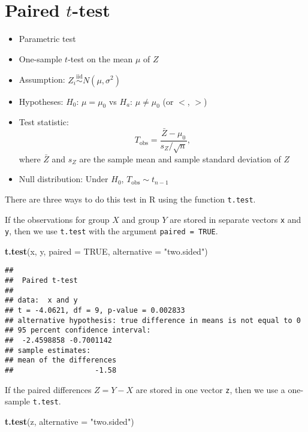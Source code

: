 \documentclass[
]{book}
\newenvironment{Shaded}{\begin{snugshade}}{\end{snugshade}}
\newcommand{\DataTypeTok}[1]{\textcolor[rgb]{0.13,0.29,0.53}{#1}}
\newcommand{\KeywordTok}[1]{\textcolor[rgb]{0.13,0.29,0.53}{\textbf{#1}}}
\newcommand{\NormalTok}[1]{#1}
\newcommand{\OtherTok}[1]{\textcolor[rgb]{0.56,0.35,0.01}{#1}}
\newcommand{\StringTok}[1]{\textcolor[rgb]{0.31,0.60,0.02}{#1}}
\providecommand{\tightlist}{%
  \setlength{\itemsep}{0pt}\setlength{\parskip}{0pt}}
\begin{document}
\hypertarget{paired-t-test}{%
\section{\texorpdfstring{Paired \(t\)-test}{Paired t-test}}\label{paired-t-test}}

\begin{itemize}
\tightlist
\item
  Parametric test
\item
  One-sample \(t\)-test on the mean \(\mu\) of \(Z\)
\item
  Assumption: \(Z_i \overset{\mathrm{iid}} \sim N(\mu, \sigma^2)\)
\item
  Hypotheses: \(H_0\): \(\mu = \mu_0\) vs \(H_a\): \(\mu \neq \mu_0\) (or \(<\), \(>\))
\item
  Test statistic: \[T_{\mathrm{obs}} = \frac{\bar{Z} - \mu_0}{s_Z / \sqrt{n}},\]
  where \(\bar{Z}\) and \(s_Z\) are the sample mean and sample standard deviation
  of \(Z\)
\item
  Null distribution: Under \(H_0\), \(T_{\mathrm{obs}} \sim t_{n-1}\)
\end{itemize}

There are three ways to do this test in R using the function \texttt{t.test}.

If the observations for group \(X\) and group \(Y\) are stored in separate vectors \texttt{x} and \texttt{y},
then we use \texttt{t.test} with the argument \texttt{paired\ =\ TRUE}.

\begin{Shaded}
\begin{Highlighting}[]
\KeywordTok{t.test}\NormalTok{(x, y, }\DataTypeTok{paired =} \OtherTok{TRUE}\NormalTok{, }\DataTypeTok{alternative =} \StringTok{"two.sided"}\NormalTok{)}
\end{Highlighting}
\end{Shaded}

\begin{verbatim}
## 
##  Paired t-test
## 
## data:  x and y
## t = -4.0621, df = 9, p-value = 0.002833
## alternative hypothesis: true difference in means is not equal to 0
## 95 percent confidence interval:
##  -2.4598858 -0.7001142
## sample estimates:
## mean of the differences 
##                   -1.58
\end{verbatim}

If the paired differences \(Z = Y - X\) are stored in one vector
\texttt{z}, then we use a one-sample \texttt{t.test}.

\begin{Shaded}
\begin{Highlighting}[]
\KeywordTok{t.test}\NormalTok{(z, }\DataTypeTok{alternative =} \StringTok{"two.sided"}\NormalTok{)}
\end{Highlighting}
\end{Shaded}
\end{document}
